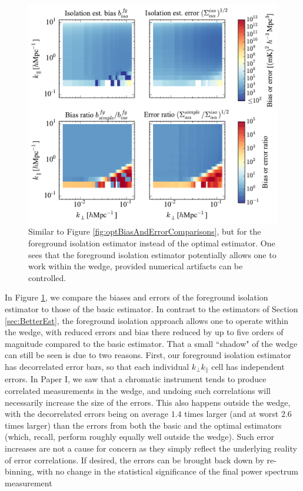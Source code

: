 \documentclass[twocolumn,aps,prd,nofootinbib,showpacs]{revtex4-1}
\begin{document}
\begin{figure}[!ht] 
	\centering 
	\includegraphics[width=1.\textwidth]{figures/isolationBiasAndErrorComparisons.pdf}
	\caption{Similar to Figure \ref{fig:optBiasAndErrorComparisons}, but for the foreground isolation estimator instead of the optimal estimator.  One sees that the foreground isolation estimator potentially allows one to work within the wedge, provided numerical artifacts can be controlled.}
	\label{fig:isolationBiasAndErrorComparisons}
\end{figure} 

In Figure \ref{fig:isolationBiasAndErrorComparisons}, we compare the biases and errors of the foreground isolation estimator to those of the basic estimator.  In contrast to the estimators of Section \ref{sec:BetterEst}, the foreground isolation approach allows one to operate within the wedge, with reduced errors and bias there reduced by up to five orders of magnitude compared to the basic estimator.  That a small ``shadow" of the wedge can still be seen is due to two reasons.  First, our foreground isolation estimator has decorrelated error bars, so that each individual $k_\perp k_\parallel$ cell has independent errors.  In Paper I, we saw that a chromatic instrument tends to produce correlated measurements in the wedge, and undoing such correlations will necessarily increase the size of the errors.  This also happens outside the wedge, with the decorrelated errors being on average $1.4$ times larger (and at worst $2.6$ times larger) than the errors from both the basic and the optimal estimators (which, recall, perform roughly equally well outside the wedge).  Such error increases are not a cause for concern as they simply reflect the underlying reality of error correlations.  If desired, the errors can be brought back down by re-binning, with no change in the statistical significance of the final power spectrum measurement
\end{document}
